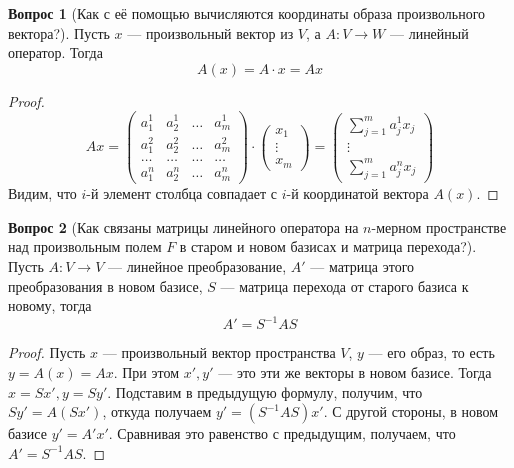 \documentclass[a4paper,11pt]{article}
\theoremstyle{remark}
\theoremstyle{definition}
\newtheorem{question}{Вопрос}
\numberwithin{question}{subsection}
\begin{document}
\begin{question}[Как с её помощью вычисляются координаты образа произвольного вектора?]
Пусть \(x\) --- произвольный вектор из \(V\), а \(A: V \rightarrow W\) --- линейный оператор. Тогда
\begin{equation*}
	A(x) = A \cdot x = Ax
\end{equation*}

\begin{proof}
\begin{equation*}
	Ax =
	\begin{pmatrix}
		a^1_1 & a^1_2 & \dots & a^1_m \\
		a^2_1 & a^2_2 & \dots & a^2_m \\
		\dots & \dots & \dots & \dots \\
		a^n_1 & a^n_2 & \dots & a^n_m
	\end{pmatrix} \cdot 
	\begin{pmatrix}
		x_1 \\
		\vdots \\
		x_m
	\end{pmatrix} =
	\begin{pmatrix}
		\sum_{j = 1}^m a^1_j x_j \\
		\vdots \\
		\sum_{j = 1}^m a^n_j x_j 
	\end{pmatrix}
\end{equation*}
Видим, что \(i\)-й элемент столбца совпадает с \(i\)-й координатой вектора \(A(x)\).
\end{proof}
\end{question}

\begin{question}[Как связаны матрицы линейного оператора на \(n\)-мерном пространстве над произвольным полем \(F\) в старом и новом базисах и матрица перехода?]
Пусть \(A: V \rightarrow V\) --- линейное преобразование, \(A'\) --- матрица этого преобразования в новом базисе, \(S\) --- матрица перехода от старого базиса к новому, тогда
\begin{equation*}
	A' = S^{-1}AS
\end{equation*} 
\begin{proof}
Пусть \(x\) --- произвольный вектор пространства \(V\), \(y\) --- его образ, то есть \(y = A(x) = Ax\). При этом \(x', y'\) --- это эти же векторы в новом базисе. Тогда \(x = Sx', y = Sy'\). Подставим в предыдущую формулу, получим, что \(Sy' = A(Sx')\), откуда получаем \(y' = (S^{-1}AS)x'\). С другой стороны, в новом базисе \(y' = A'x'\). Сравнивая это равенство с предыдущим, получаем, что \(A' = S^{-1}AS\).
\end{proof}
\end{question}
\end{document}
